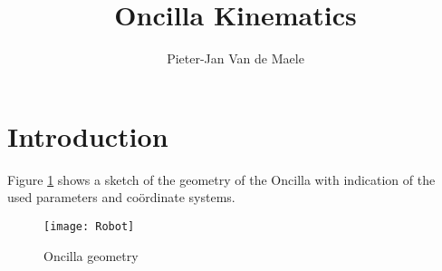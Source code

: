 \documentclass[a4paper,10pt]{article}
\begin{document}
\title{Oncilla Kinematics}
\author{Pieter-Jan Van de Maele}
\maketitle

\section{Introduction}
Figure \ref{fig:oncilla_geometry} shows a sketch of the geometry of the Oncilla with indication of the used parameters and co\"{o}rdinate systems.
\begin{figure}[h!]
  \centering
  \texttt{[image: Robot]}
  \caption{Oncilla geometry}
  \label{fig:oncilla_geometry}
\end{figure}
\end{document}
